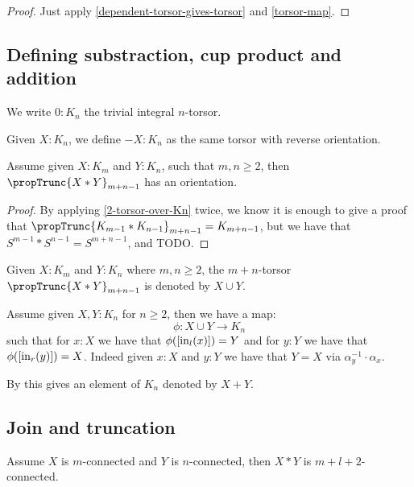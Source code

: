 \begin{proof}
Just apply \cref{dependent-torsor-gives-torsor} and \cref{torsor-map}.
\end{proof}


\subsection{Defining substraction, cup product and addition}

We write $0:K_n$ the trivial integral $n$-torsor.

\begin{definition}
Given $X:K_n$, we define $-X:K_n$ as the same torsor with reverse orientation.
\end{definition}

\begin{lemma}
Assume given $X:K_{m}$ and $Y:K_{n}$, such that $m,n\geq 2$, then $\propTrunc{X*Y}_{m+n-1}$ has an orientation.
\end{lemma}

\begin{proof}
By applying \cref{2-torsor-over-Kn} twice, we know it is enough to give a proof that $\propTrunc{K_{m-1}*K_{n-1}}_{m+n-1} = K_{m+n-1}$, but we have that $S^{m-1}*S^{n-1} = S^{m+n-1}$, and TODO.
\end{proof}

\begin{definition}
Given $X:K_{m}$ and $Y:K_{n}$ where $m,n\geq 2$, the $m+n$-torsor $\propTrunc{X*Y}_{m+n-1}$ is denoted by $X\cup Y$.
\end{definition}

\begin{definition}
Assume given $X,Y:K_n$ for $n\geq 2$, then we have a map:
\[\phi : X\cup Y \to K_n\]
such that for $x:X$ we have that $\phi([\mathrm{in}_l(x)]) = Y$ and  for $y:Y$ we have that $\phi([\mathrm{in}_r(y)]) = X$. Indeed given $x:X$ and $y:Y$ we have that $Y = X$ via $\alpha_y^{-1}\cdot \alpha_x$. 

 By  this gives an element of $K_n$ denoted by $X+Y$.
\end{definition}


\subsection{Join and truncation}

\begin{lemma}
Assume $X$ is $m$-connected and $Y$ is $n$-connected, then $X*Y$ is $m+l+2$-connected.
\end{lemma}

